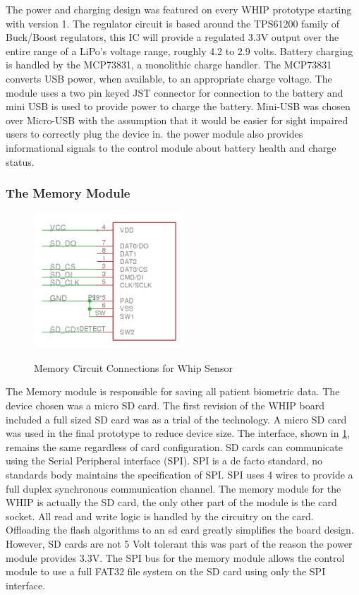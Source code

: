 The power and charging design was featured on every WHIP prototype starting with version 1. The regulator circuit is based around the TPS61200 family of Buck/Boost regulators\cite{TPS610X}, this IC will provide a regulated 3.3V output over the entire range of a LiPo's voltage range, roughly 4.2 to 2.9 volts. Battery charging is handled by the MCP73831, a monolithic charge handler\cite{MCP73831}. The MCP73831 converts USB power, when available, to an appropriate charge voltage. The module uses a two pin keyed JST connector for connection to the battery and mini USB is used to provide power to charge the battery. Mini-USB was chosen over Micro-USB with the assumption that it would be easier for sight impaired users to correctly plug the device in. the power module also provides informational signals to the control module about battery health and charge status.


\subsubsection {The Memory Module}
\begin{figure}
	\begin{center}
		\label{fig:Rev5_SDCARD}
		\includegraphics[scale=1,width=0.5\textwidth]{Images/Rev5_SDCARD.png} 
		\caption{Memory Circuit Connections for Whip Sensor}
	\end{center}
\end{figure}
The Memory module is responsible for saving all patient biometric data. The device chosen was a micro SD card. The first revision of the WHIP board included a full sized SD card was as a trial of the technology. A micro SD card was used in the final prototype to reduce device size. The interface, shown in \cref{fig:Rev5_SDCARD}, remains the same regardless of card configuration. SD cards can communicate using the Serial Peripheral interface (SPI). SPI is a de facto standard, no standards body maintains the specification of SPI. SPI uses 4 wires to provide a full duplex synchronous communication channel. The memory module for the WHIP is actually the SD card, the only other part of the module is the card socket. All read and write logic is handled by the circuitry on the card. Offloading the flash algorithms to an sd card greatly simplifies the board design. However, SD cards are not 5 Volt tolerant this was part of the reason the power module provides 3.3V. The SPI bus for the memory module allows the control module to use a full FAT32 file system on the SD card using only the SPI interface.

